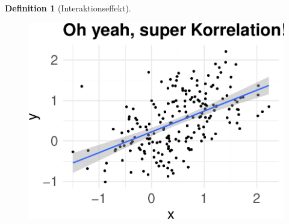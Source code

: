 \documentclass[
  letterpaper,
]{scrbook}
\theoremstyle{definition}
\theoremstyle{definition}
\theoremstyle{definition}
\newtheorem{definition}{Definition}[chapter]
\theoremstyle{remark}
\begin{document}
\begin{definition}[Interaktionseffekt]
\begin{figure}
\begin{minipage}{0.45\linewidth}
{\includegraphics[width=1\linewidth,height=\textheight,keepaspectratio]{090-regression2_files/figure-pdf/fig-confounder-1.pdf}

}


\end{minipage}%
%
\begin{minipage}{0.10\linewidth}
~\end{minipage}%
%
\begin{minipage}{0.45\linewidth}

\end{minipage}
\end{figure}
\end{definition}
\end{document}
